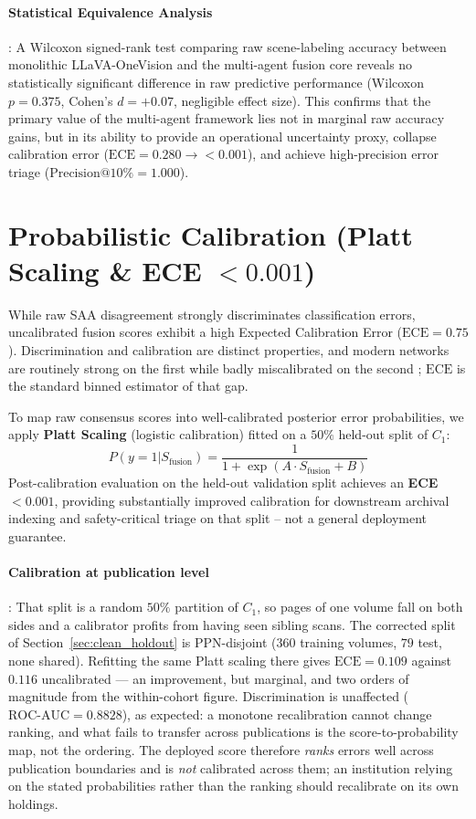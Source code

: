 \documentclass[12pt,a4paper]{report}
\begin{document}
\paragraph{Statistical Equivalence Analysis}: A Wilcoxon signed-rank test comparing raw scene-labeling accuracy between monolithic LLaVA-OneVision and the multi-agent fusion core reveals no statistically significant difference in raw predictive performance (Wilcoxon $p = 0.375$, Cohen's $d = +0.07$, negligible effect size). This confirms that the primary value of the multi-agent framework lies not in marginal raw accuracy gains, but in its ability to provide an operational uncertainty proxy, collapse calibration error ($\text{ECE} = 0.280 \rightarrow < 0.001$), and achieve high-precision error triage ($\text{Precision@10\%} = 1.000$).

\section{Probabilistic Calibration (Platt Scaling \& ECE $< 0.001$)}
While raw SAA disagreement strongly discriminates classification errors, uncalibrated fusion scores exhibit a high Expected Calibration Error ($\text{ECE} = 0.75$). Discrimination and calibration are distinct properties, and modern networks are routinely strong on the first while badly miscalibrated on the second \cite{guo2017calibration}; $\text{ECE}$ is the standard binned estimator of that gap. 

To map raw consensus scores into well-calibrated posterior error probabilities, we apply \textbf{Platt Scaling} \cite{platt1999probabilistic} (logistic calibration) fitted on a $50\%$ held-out split of $C_1$:
\begin{equation}
    P(y=1 | S_{\text{fusion}}) = \frac{1}{1 + \exp(A \cdot S_{\text{fusion}} + B)}
\end{equation}
Post-calibration evaluation on the held-out validation split achieves an \textbf{ECE $< 0.001$}, providing substantially improved calibration for downstream archival indexing and safety-critical triage on that split -- not a general deployment guarantee.

\paragraph{Calibration at publication level}: That split is a random $50\%$ partition of $C_1$, so pages of one volume fall on both sides and a calibrator profits from having seen sibling scans. The corrected split of Section~\ref{sec:clean_holdout} is PPN-disjoint ($360$ training volumes, $79$ test, none shared). Refitting the same Platt scaling there gives $\text{ECE} = 0.109$ against $0.116$ uncalibrated --- an improvement, but marginal, and two orders of magnitude from the within-cohort figure. Discrimination is unaffected ($\text{ROC-AUC} = 0.8828$), as expected: a monotone recalibration cannot change ranking, and what fails to transfer across publications is the score-to-probability map, not the ordering. The deployed score therefore \emph{ranks} errors well across publication boundaries and is \emph{not} calibrated across them; an institution relying on the stated probabilities rather than the ranking should recalibrate on its own holdings.
\end{document}
